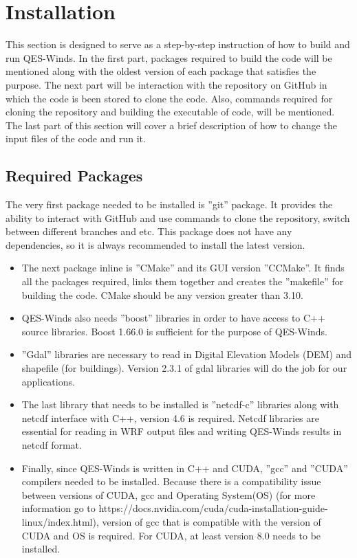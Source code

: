 \section{Installation}

This section is designed to serve as a step-by-step instruction of how to build and run QES-Winds. In the first part, packages required to build the code will be mentioned along with the oldest version of each package that satisfies the purpose. The next part will be interaction with the repository on GitHub in which the code is been stored to clone the code. Also, commands required for cloning the repository and building the executable of code, will be mentioned. The last part of this section will cover a brief description of how to change the input files of the code and run it.

\subsection{Required Packages}

The very first package needed to be installed is ''git'' package. It provides the ability to interact with GitHub and use commands to clone the repository, switch between different branches and etc. This package does not have any dependencies, so it is always recommended to install the latest version. 

\begin{itemize}
\item The next package inline is ''CMake'' and its GUI version ''CCMake''. It finds all the packages required, links them together and creates the ''makefile'' for building the code. CMake should be any version greater than 3.10.
\item QES-Winds also needs ''boost'' libraries in order to have access to C++ source libraries. Boost 1.66.0 is sufficient for the purpose of QES-Winds. 
\item ''Gdal'' libraries are necessary to read in Digital Elevation Models (DEM) and shapefile (for buildings). Version 2.3.1 of gdal libraries will do the job for our applications. 

\item The last library that needs to be installed is ''netcdf-c'' libraries along with netcdf interface with C++, version 4.6 is required. Netcdf libraries are essential for reading in WRF output files and writing QES-Winds results in netcdf format.

\item Finally, since QES-Winds is written in C++ and CUDA, ''gcc'' and ''CUDA'' compilers needed to be installed. Because there is a compatibility issue between versions of CUDA, gcc and Operating System(OS) (for more information go to https://docs.nvidia.com/cuda/cuda-installation-guide-linux/index.html), version of gcc that is compatible with the version of CUDA and OS is required. For CUDA, at least version 8.0 needs to be installed.
\end{itemize}


